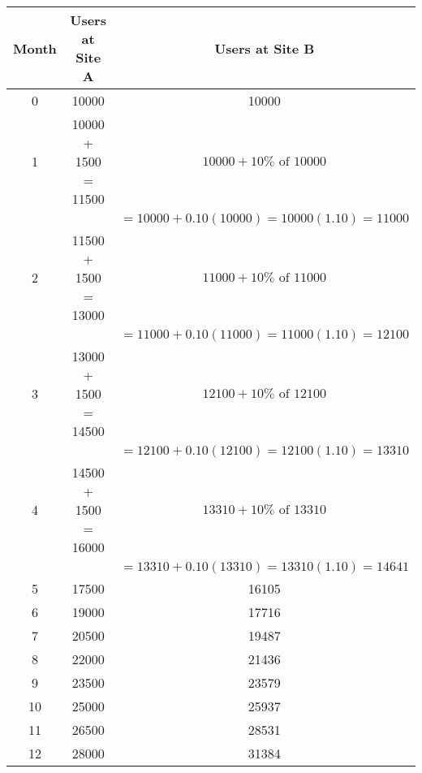 \begin{center}
    \begin{tabular}{|c|c|c|}
        \hline
        Month & Users at Site A      & Users at Site B                                   \\
        \hline
        0     & 10000                & 10000                                             \\
        \hline
        1     & 10000 + 1500 = 11500 & \( 10000 + 10\% \text{ of } 10000 \)              \\
              &                      & \( = 10000 + 0.10(10000) = 10000(1.10) = 11000 \) \\
        \hline
        2     & 11500 + 1500 = 13000 & \( 11000 + 10\% \text{ of } 11000 \)              \\
              &                      & \( = 11000 + 0.10(11000) = 11000(1.10) = 12100 \) \\
        \hline
        3     & 13000 + 1500 = 14500 & \( 12100 + 10\% \text{ of } 12100 \)              \\
              &                      & \( = 12100 + 0.10(12100) = 12100(1.10) = 13310 \) \\
        \hline
        4     & 14500 + 1500 = 16000 & \( 13310 + 10\% \text{ of } 13310 \)              \\
              &                      & \( = 13310 + 0.10(13310) = 13310(1.10) = 14641 \) \\
        \hline
        5     & 17500                & 16105                                             \\
        \hline
        6     & 19000                & 17716                                             \\
        \hline
        7     & 20500                & 19487                                             \\
        \hline
        8     & 22000                & 21436                                             \\
        \hline
        9     & 23500                & 23579                                             \\
        \hline
        10    & 25000                & 25937                                             \\
        \hline
        11    & 26500                & 28531                                             \\
        \hline
        12    & 28000                & 31384                                             \\
        \hline
    \end{tabular}
\end{center}

